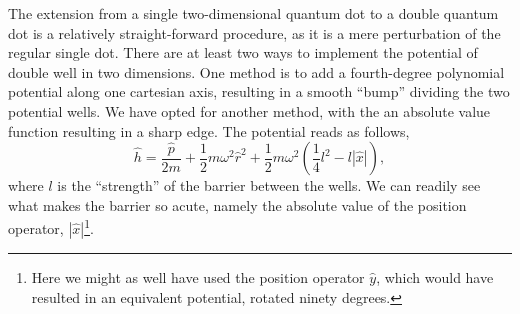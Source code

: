 The extension from a single two-dimensional quantum dot to a double 
quantum dot is a relatively straight-forward procedure, as it is 
a mere perturbation of the regular single dot. There are at least two ways to
implement the potential of double well in two dimensions. One method 
is to add a fourth-degree polynomial potential along one cartesian axis, resulting 
in a smooth ``bump'' dividing the two potential wells. We have opted for another 
method, with the an absolute value function resulting in a sharp edge. The 
potential reads as follows,
\begin{equation}
    \label{eq:sharp_double_well_one_body}
    \hat{h} = \frac{\hat{p}}{2m} + \frac{1}{2}m \omega^2 \hat{r}^2
        + \frac{1}{2}m\omega^2\left(\frac{1}{4}l^2 - l |\hat{x}| \right),
\end{equation}
where $l$ is the ``strength'' of the barrier between the wells. We 
can readily see what makes the barrier so acute, namely the absolute 
value of the position operator, $|\hat{x}|$\footnote{Here we might as 
well have used the position operator $\hat{y}$, which would have resulted 
in an equivalent potential, rotated ninety degrees.}.

